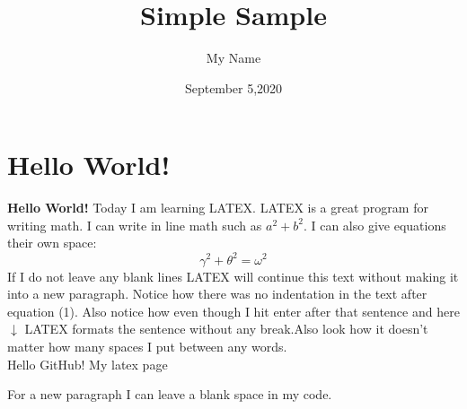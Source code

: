 \documentclass[10 pt]{article}
\begin{document}
\title{Simple Sample}
\author{My Name}
\date{September 5,2020}
\maketitle
\section{Hello World!}
\textbf{Hello World!}
Today I am learning {\Large L}A{\Large T}E{\Large X}. LATEX is a great program for writing math. I can write in line math such as $a^2+b^2$. I can also give equations their own space:
\begin{equation}
\gamma^2+\theta^2=\omega^2
\end{equation}
If I do not leave any blank lines LATEX will continue this text without making it into a new paragraph. Notice how there was no indentation in the text after equation (1). Also notice how even though I hit enter after that sentence and here $\downarrow$ LATEX formats the sentence without any break.Also look how it doesn't
matter how many spaces I put between any words. \\ 
Hello GitHub! My latex page

For a new paragraph I can leave a blank space in my code.
\end{document}
